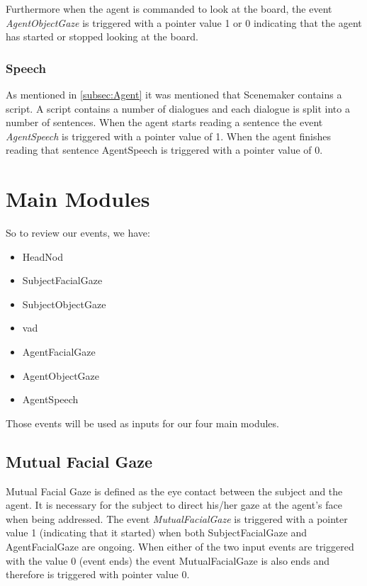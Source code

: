 \documentclass[12pt, a4paper, fleqn]{memoir}%
\begin{document}
Furthermore when the agent is commanded to look at the board, the event \textit{AgentObjectGaze} is triggered with a pointer value 1 or 0 indicating that the agent has started or stopped looking at the board.

\subsection{Speech}
As mentioned in \ref{subsec:Agent} it was mentioned that Scenemaker contains a script. A script contains a number of dialogues and each dialogue is split into a number of sentences. When the agent starts reading a sentence the event \textit{AgentSpeech} is triggered with a pointer value of 1. When the agent finishes reading that sentence AgentSpeech is triggered with a pointer value of 0.

\chapter{Main Modules}
\label{chap:MainModules}
So to review our events, we have:

\begin{itemize}
  \item HeadNod
  \item SubjectFacialGaze
  \item SubjectObjectGaze
  \item vad
  \item AgentFacialGaze
  \item AgentObjectGaze
  \item AgentSpeech
\end{itemize}

Those events will be used as inputs for our four main modules.

\section{Mutual Facial Gaze}
\label{sec:MutualFacialGaze}
Mutual Facial Gaze is defined as the eye contact between the subject and the agent. It is necessary for the subject to direct his/her gaze at the agent's face when being addressed. The event \textit{MutualFacialGaze} is triggered with a pointer value 1 (indicating that it started) when both SubjectFacialGaze and AgentFacialGaze are ongoing. When either of the two input events are triggered with the value 0 (event ends) the event MutualFacialGaze is also ends and therefore is triggered with pointer value 0.
\end{document}
